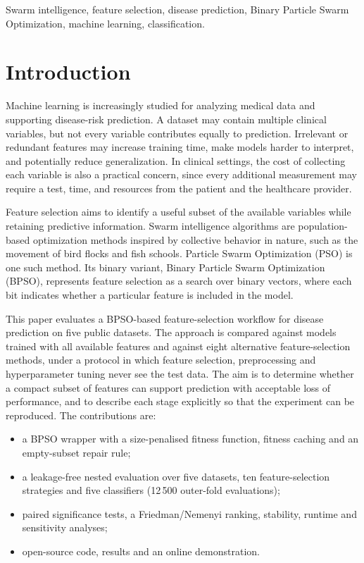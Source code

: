 \documentclass[conference]{IEEEtran}
\begin{document}
\begin{IEEEkeywords}
Swarm intelligence, feature selection, disease prediction, Binary Particle
Swarm Optimization, machine learning, classification.
\end{IEEEkeywords}

\section{Introduction}

Machine learning is increasingly studied for analyzing medical data and
supporting disease-risk prediction. A dataset may contain multiple clinical
variables, but not every variable contributes equally to prediction.
Irrelevant or redundant features may increase training time, make models
harder to interpret, and potentially reduce generalization. In clinical
settings, the cost of collecting each variable is also a practical concern,
since every additional measurement may require a test, time, and resources
from the patient and the healthcare provider.

Feature selection aims to identify a useful subset of the available variables
while retaining predictive information. Swarm intelligence algorithms are
population-based optimization methods inspired by collective behavior in
nature, such as the movement of bird flocks and fish schools. Particle Swarm
Optimization (PSO) is one such method. Its binary variant, Binary Particle
Swarm Optimization (BPSO), represents feature selection as a search over
binary vectors, where each bit indicates whether a particular feature is
included in the model.

This paper evaluates a BPSO-based feature-selection workflow for disease
prediction on five public datasets. The approach is compared against models
trained with all available features and against eight alternative
feature-selection methods, under a protocol in which feature selection,
preprocessing and hyperparameter tuning never see the test data. The aim is
to determine whether a compact subset of features can support prediction with
acceptable loss of performance, and to describe each stage explicitly so that
the experiment can be reproduced. The contributions are:
\begin{itemize}
\item a BPSO wrapper with a size-penalised fitness function, fitness caching
and an empty-subset repair rule;
\item a leakage-free nested evaluation over five datasets, ten
feature-selection strategies and five classifiers (12\,500 outer-fold
evaluations);
\item paired significance tests, a Friedman/Nemenyi ranking, stability,
runtime and sensitivity analyses;
\item open-source code, results and an online demonstration.
\end{itemize}
\end{document}
